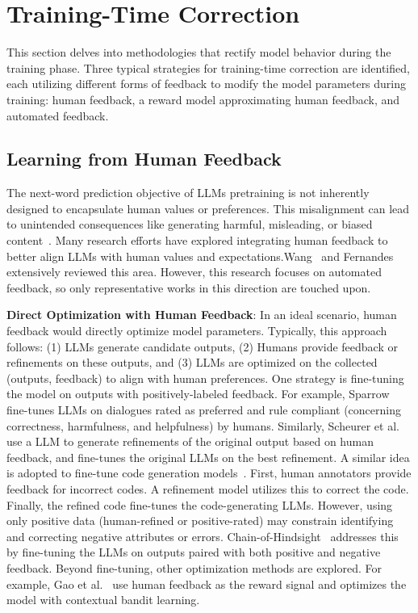 \documentclass[a4paper,oneside]{book}
\begin{document}
\section{Training-Time Correction}
This section delves into methodologies that rectify model behavior during the training phase. Three typical strategies for training-time correction are identified, each utilizing different forms of feedback to modify the model parameters during training: human feedback, a reward model approximating human feedback, and automated feedback.

\subsection{Learning from Human Feedback}
The next-word prediction objective of LLMs pretraining is not inherently designed to encapsulate human values or preferences. This misalignment can lead to unintended consequences like generating harmful, misleading, or biased content~\cite{kenton2021alignment}. Many research efforts have explored integrating human feedback to better align LLMs with human values and expectations.Wang~\cite{wang2023aligning} and Fernandes~\cite{fernandes2023bridging} extensively reviewed this area. However, this research focuses on automated feedback, so only representative works in this direction are touched upon.

\textbf{Direct Optimization with Human Feedback}: In an ideal scenario, human feedback would directly optimize model parameters. Typically, this approach follows: (1) LLMs generate candidate outputs, (2) Humans provide feedback or refinements on these outputs, and (3) LLMs are optimized on the collected (outputs, feedback) to align with human preferences. One strategy is fine-tuning the model on outputs with positively-labeled feedback. For example, Sparrow~\cite{glaese2022improving} fine-tunes LLMs on dialogues rated as preferred and rule compliant (concerning correctness, harmfulness, and helpfulness) by humans. Similarly, Scheurer et al.~\cite{scheurer2023training} use a LLM to generate refinements of the original output based on human feedback, and fine-tunes the original LLMs on the best refinement. A similar idea is adopted to fine-tune code generation models~\cite{chen2023improving}. First, human annotators provide feedback for incorrect codes. A refinement model utilizes this to correct the code. Finally, the refined code fine-tunes the code-generating LLMs. However, using only positive data (human-refined or positive-rated) may constrain identifying and correcting negative attributes or errors. Chain-of-Hindsight~\cite{liu2023chain} addresses this by fine-tuning the LLMs on outputs paired with both positive and negative feedback. Beyond fine-tuning, other optimization methods are explored. For example, Gao et al.~\cite{gao2023continually} use human feedback as the reward signal and optimizes the model with contextual bandit learning.
\end{document}
